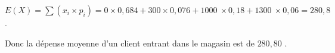 \documentclass[10pt]{article}
\providecommand{\euro}{\texteuro}
\providecommand{\np}[2][]{{#2~#1}}
\providecommand{\euro}{{\text{€}}}
\providecommand{\ds}{\displaystyle}
\renewcommand{\euro}{\ifmmode\text{\texteuro}\else\texteuro\fi}
\begin{document}
\begin{enumerate}
\begin{enumerate}
$E(X)=\ds\sum (x_i\times p_i) = 0\times 0,684 + 300\times 0,076 + \np{1000}\times 0,18 + \np{1300}\times 0,06 =280,8$.


Donc la dépense moyenne d'un client entrant dans le magasin est de $280,80$ \euro.
	\end{enumerate}
\end{enumerate}

\vspace{0.5cm}
\end{document}
